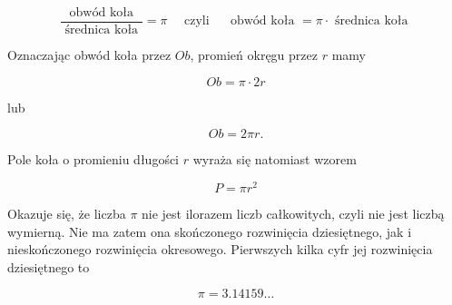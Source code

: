 \documentclass[10pt]{article}
\begin{document}
\[
\frac{\text { obwód koła }}{\text { średnica koła }}=\pi \quad \text { czyli } \quad \text { obwód koła }=\pi \cdot \text { średnica koła }
\]

Oznaczając obwód koła przez \(O b\), promień okręgu przez \(r\) mamy

\[
O b=\pi \cdot 2 r
\]

lub

\[
O b=2 \pi r .
\]

Pole koła o promieniu długości \(r\) wyraża się natomiast wzorem

\[
P=\pi r^{2}
\]

Okazuje się, że liczba \(\pi\) nie jest ilorazem liczb całkowitych, czyli nie jest liczbą wymierną. Nie ma zatem ona skończonego rozwinięcia dziesiętnego, jak i nieskończonego rozwinięcia okresowego. Pierwszych kilka cyfr jej rozwinięcia dziesiętnego to

\[
\pi=3.14159 \ldots
\]
\end{document}
